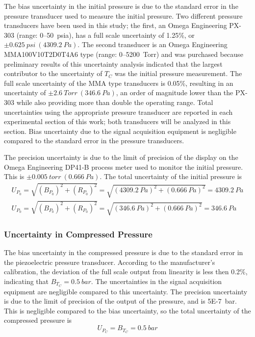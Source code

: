 \documentclass[12pt, letterpaper]{article}
\begin{document}
The bias uncertainty in the initial pressure is due to the
standard error in the pressure transducer used to measure
the initial pressure. Two different pressure transducers have
been used in this study; the first, an Omega Engineering PX-303
(range: 0--\SI{50}{psia}), has a full scale uncertainty of 1.25\%, or
$\pm \SI{0.625}{psi} \ (\SI{4309.2}{Pa})$. The second transducer is an
Omega Engineering MMA100V10T2D0T4A6 type (range: 0--\SI{5200}{Torr}) and was
purchased because preliminary results of this uncertainty analysis
indicated that the largest contributor to the uncertainty of $T_C$ was
the initial pressure measurement. The full scale uncertainty of the MMA
type transducers is 0.05\%, resulting in an uncertainty of
$\pm \SI{2.6}{Torr} \ (\SI{346.6}{Pa})$, an order of magnitude lower than
the PX-303 while also providing more than double the operating range. Total
uncertainties using the appropriate pressure transducer are reported in
each experimental section of this work; both transducers will be analyzed
in this section. Bias uncertainty due to the signal acquisition equipment
is negligible compared to the standard error in the pressure transducers.

The precision uncertainty is due to the limit of precision of the display
on the Omega Engineering DP41-B process meter used to monitor the initial
pressure. This is $\pm\SI{0.005}{torr} \ (\SI{0.666}{Pa})$. The total
uncertainty of the initial pressure is
%
\begin{subequations}
\begin{align}
U_{P_0} = \sqrt{\left(B_{P_0}\right)^2 + \left(R_{P_0}\right)^2} = \sqrt{\left(\SI{4309.2}{Pa}\right)^2 + \left(\SI{0.666}{Pa}\right)^2} = \SI{4309.2}{Pa} \\
U_{P_0} = \sqrt{\left(B_{P_0}\right)^2 + \left(R_{P_0}\right)^2} = \sqrt{\left(\SI{346.6}{Pa}\right)^2 + \left(\SI{0.666}{Pa}\right)^2} = \SI{346.6}{Pa}
\end{align}
\end{subequations}

\subsubsection{Uncertainty in Compressed Pressure}

The bias uncertainty in the compressed pressure is due to the standard
error in the piezoelectric pressure transducer. According to the
manufacturer's calibration, the deviation of the full scale output from
linearity is less then 0.2\%, indicating that $B_{T_C}=\SI{0.5}{bar}$.
The uncertainties in the signal acquisition equipment are negligible
compared to this uncertainty. The precision uncertainty is due to the limit
of precision of the output of the pressure, and is \SI{5E-7}{bar}. This
is negligible compared to the bias uncertainty, so the total uncertainty
of the compressed pressure is
%
\begin{equation}
U_{P_C} = B_{T_C} = \SI{0.5}{bar}
\end{equation}
\end{document}
